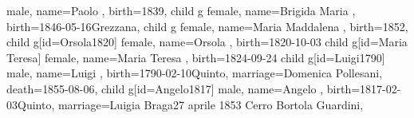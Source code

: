 \documentclass{article}
\begin{document}
\begin{midpage}
\begin{center}
\begin{genealogypicture}
{{{{{{{{{{{                                            male,
                                            name={Paolo },
                                            birth={1839}{},
                                        }
                                    }
                                    child{
                                        g{
                                            female,
                                            name={Brigida Maria },
                                            birth={1846-05-16}{Grezzana},
                                        }
                                    }
                                    child{
                                        g{
                                            female,
                                            name={Maria Maddalena },
                                            birth={1852}{},
                                        }
                                    }
                                }
                                child{
                                    g[id=Orsola1820]{
                                        female,
                                        name={Orsola },
                                        birth={1820-10-03}{}
                                    }
                                }
                                child{
                                    g[id=Maria Teresa]{
                                        female,
                                        name={Maria Teresa },
                                        birth={1824-09-24}{}
                                    }
                                }
                            }
                            child{
                                g[id=Luigi1790]{
                                    male,
                                    name={Luigi },
                                    birth={1790-02-10}{Quinto},
                                    marriage={Domenica Pollesani}{},
                                    death={1855-08-06}{},
                                }
                                child{
                                    g[id=Angelo1817]{
                                        male,
                                        name={Angelo },
                                        birth={1817-02-03}{Quinto},
                                        marriage={Luigia Braga}{27 aprile 1853 \newline Cerro \newline Bortola Guardini},
}}}}}}}}}}
\end{genealogypicture}
\end{center}
\end{midpage}
\end{document}
